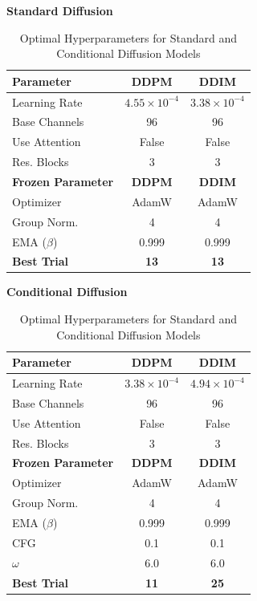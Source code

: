 \documentclass[runningheads]{llncs}
\begin{document}
\begin{table}[H]
    \centering
    \caption{Optimal Hyperparameters for Standard and Conditional Diffusion Models}
    \label{tab:best_diffusion_params}
    
    \begin{minipage}{.49\textwidth}
        \centering
        \textbf{Standard Diffusion} \\[0.5em]
        \begin{tabular}{lcc}
        \hline
        \textbf{Parameter} & \textbf{DDPM} & \textbf{DDIM} \\
        \hline
        Learning Rate & $4.55 \times 10^{-4}$ & $3.38 \times 10^{-4}$ \\
        Base Channels & 96 & 96 \\
        Use Attention & False & False \\
        Res. Blocks & 3 & 3 \\
        \hline
        \textbf{Frozen Parameter} & \textbf{DDPM} & \textbf{DDIM}\\
        \hline
        Optimizer & AdamW & AdamW \\
        Group Norm. & 4 & 4 \\
        EMA ($\beta$) & 0.999 & 0.999\\
        \hline
        \textbf{Best Trial} & \textbf{13} & \textbf{13} \\
        \hline
        \end{tabular}
    \end{minipage}\hfill
    \begin{minipage}{.49\textwidth}
        \centering
        \textbf{Conditional Diffusion} \\[0.5em]
        \begin{tabular}{lcc}
        \hline
        \textbf{Parameter} & \textbf{DDPM} & \textbf{DDIM} \\
        \hline
        Learning Rate & $3.38 \times 10^{-4}$ & $4.94 \times 10^{-4}$ \\
        Base Channels & 96 & 96 \\
        Use Attention & False & False \\
        Res. Blocks & 3 & 3 \\
        \hline
        \textbf{Frozen Parameter} & \textbf{DDPM} & \textbf{DDIM}\\
        \hline
        Optimizer & AdamW & AdamW \\
        Group Norm. & 4 & 4 \\
        EMA ($\beta$) & 0.999 & 0.999\\
        CFG & 0.1 & 0.1 \\
        $\omega$ & 6.0 & 6.0 \\
        \hline
        \textbf{Best Trial} & \textbf{11} & \textbf{25} \\
        \hline
        \end{tabular}
    \end{minipage}
\end{table}
\end{document}
